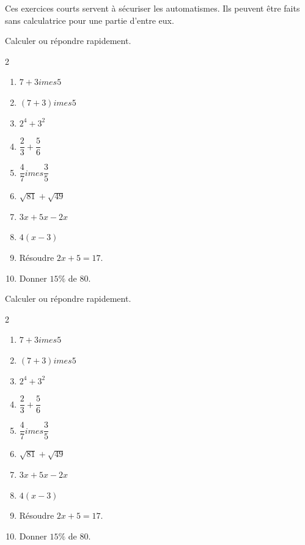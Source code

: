 \documentclass[11pt,a4paper]{article}
\newcounter{exercice}
\begin{document}
\begin{objectif}
Ces exercices courts servent à sécuriser les automatismes. Ils peuvent être faits sans calculatrice pour une partie d'entre eux.
\end{objectif}
\begin{exercice}
Calculer ou répondre rapidement.
\begin{multicols}{2}
\begin{enumerate}[label=\alph*)]
  \item $7+3	imes 5$
  \item $(7+3)	imes 5$
  \item $2^4+3^2$
  \item $\dfrac{2}{3}+\dfrac{5}{6}$
  \item $\dfrac{4}{7}	imes\dfrac{3}{5}$
  \item $\sqrt{81}+\sqrt{49}$
  \item $3x+5x-2x$
  \item $4(x-3)$
  \item Résoudre $2x+5=17$.
  \item Donner $15\%$ de $80$.
\end{enumerate}
\end{multicols}
\end{exercice}
\begin{exercice}
Calculer ou répondre rapidement.
\begin{multicols}{2}
\begin{enumerate}[label=\alph*)]
  \item $7+3	imes 5$
  \item $(7+3)	imes 5$
  \item $2^4+3^2$
  \item $\dfrac{2}{3}+\dfrac{5}{6}$
  \item $\dfrac{4}{7}	imes\dfrac{3}{5}$
  \item $\sqrt{81}+\sqrt{49}$
  \item $3x+5x-2x$
  \item $4(x-3)$
  \item Résoudre $2x+5=17$.
  \item Donner $15\%$ de $80$.
\end{enumerate}
\end{multicols}
\end{exercice}
\end{document}

